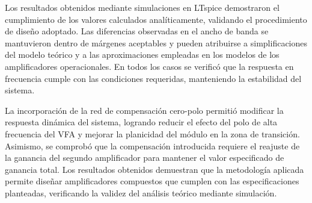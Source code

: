\documentclass[12pt,a4paper]{article}
\begin{document}
Los resultados obtenidos mediante simulaciones en LTspice demostraron el cumplimiento de los valores calculados analíticamente, validando el procedimiento de diseño adoptado. Las diferencias observadas en el ancho de banda se mantuvieron dentro de márgenes aceptables y pueden atribuirse a simplificaciones del modelo teórico y a las aproximaciones empleadas en los modelos de los amplificadores operacionales. En todos los casos se verificó que la respuesta en frecuencia cumple con las condiciones requeridas, manteniendo la estabilidad del sistema. 

La incorporación de la red de compensación cero-polo permitió modificar la respuesta dinámica del sistema, logrando reducir el efecto del polo de alta frecuencia del VFA y mejorar la planicidad del módulo en la zona de transición. Asimismo, se comprobó que la compensación introducida requiere el reajuste de la ganancia del segundo amplificador para mantener el valor especificado de ganancia total. Los resultados obtenidos demuestran que la metodología aplicada permite diseñar amplificadores compuestos que cumplen con las especificaciones planteadas, verificando la validez del análisis teórico mediante simulación. 
\end{document}
